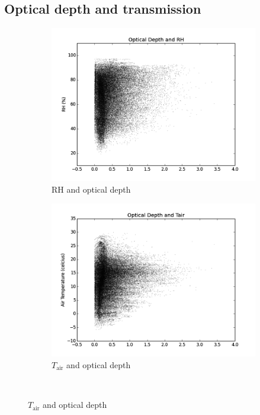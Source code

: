 \documentclass[a4paper,titlepage, twoside]{report}
\begin{document}
\subsection{Optical depth and transmission}
\begin{figure}
\centering
\begin{subfigure}{0.48\textwidth}
\includegraphics[width=\textwidth]{023_tau_RH.png}
\caption{RH and optical depth}
\end{subfigure}
\hfill
\begin{subfigure}{0.48\textwidth}
\includegraphics[width=\textwidth]{024_tau_Tair.png}
\caption{$T_\mathrm{air}$ and optical depth}
\end{subfigure}
\\

\end{figure}
\end{document}
